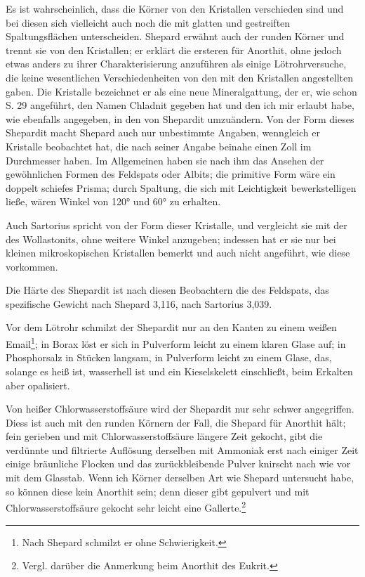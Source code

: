 \documentclass[a4paper, 11pt, oneside]{article}
\begin{document}
Es ist wahrscheinlich, dass die Körner von den Kristallen verschieden sind und bei diesen sich vielleicht auch noch die mit glatten und gestreiften Spaltungsflächen unterscheiden. Shepard erwähnt auch der runden Körner und trennt sie von den Kristallen; er erklärt die ersteren für Anorthit, ohne jedoch etwas anders zu ihrer Charakterisierung anzuführen als einige Lötrohrversuche, die keine wesentlichen Verschiedenheiten von den mit den Kristallen angestellten gaben. Die Kristalle bezeichnet er als eine neue Mineralgattung, der er, wie schon S. 29 angeführt, den Namen Chladnit gegeben hat und den ich mir erlaubt habe, wie ebenfalls angegeben, in den von Shepardit umzuändern. Von der Form dieses Shepardit macht Shepard auch nur unbestimmte Angaben, wenngleich er Kristalle beobachtet hat, die nach seiner Angabe beinahe einen Zoll im Durchmesser haben. Im Allgemeinen haben sie nach ihm das Ansehen der gewöhnlichen Formen des Feldspats oder Albits; die primitive Form wäre ein doppelt schiefes Prisma; durch Spaltung, die sich mit Leichtigkeit bewerkstelligen ließe, wären Winkel von 120° und 60° zu erhalten.

Auch Sartorius spricht von der Form dieser Kristalle, und vergleicht sie mit der des Wollastonits, ohne weitere Winkel anzugeben; indessen hat er sie nur bei kleinen mikroskopischen Kristallen bemerkt und auch nicht angeführt, wie diese vorkommen.

Die Härte des Shepardit ist nach diesen Beobachtern die des Feldspats, das spezifische Gewicht nach Shepard 3,116, nach Sartorius 3,039.

Vor dem Lötrohr schmilzt der Shepardit nur an den Kanten zu einem weißen Email\footnote{Nach Shepard schmilzt er ohne Schwierigkeit.}; in Borax löst er sich in Pulverform leicht zu einem klaren Glase auf; in Phosphorsalz in Stücken langsam, in Pulverform leicht zu einem Glase, das, solange es heiß ist, wasserhell ist und ein Kieselskelett einschließt, beim Erkalten aber opalisiert.

Von heißer Chlorwasserstoffsäure wird der Shepardit nur sehr schwer angegriffen. Diess ist auch mit den runden Körnern der Fall, die Shepard für Anorthit hält; fein gerieben und mit Chlorwasserstoffsäure längere Zeit gekocht, gibt die verdünnte und filtrierte Auflösung derselben mit Ammoniak erst nach einiger Zeit einige bräunliche Flocken und das zurückbleibende Pulver knirscht nach wie vor mit dem Glasstab. Wenn ich Körner derselben Art wie Shepard untersucht habe, so können diese kein Anorthit sein; denn dieser gibt gepulvert und mit Chlorwasserstoffsäure gekocht sehr leicht eine Gallerte.\footnote{Vergl. darüber die Anmerkung beim Anorthit des Eukrit.}
\end{document}
